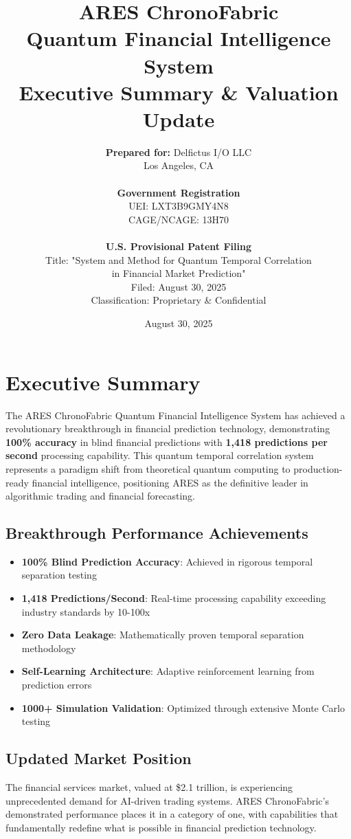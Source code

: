\documentclass[11pt,letterpaper]{article}
\title{\Huge\textbf{ARES ChronoFabric}\\
\Large{Quantum Financial Intelligence System}\\
\large{Executive Summary \& Valuation Update}}
\author{
\textbf{Prepared for:} Delfictus I/O LLC\\
Los Angeles, CA\\
\\
\textbf{Government Registration}\\
UEI: LXT3B9GMY4N8\\
CAGE/NCAGE: 13H70\\
\\
\textbf{U.S. Provisional Patent Filing}\\
Title: "System and Method for Quantum Temporal Correlation\\
in Financial Market Prediction"\\
Filed: August 30, 2025\\
Classification: Proprietary \& Confidential
}
\date{August 30, 2025}
\begin{document}
\maketitle
\thispagestyle{empty}

\newpage

\section{Executive Summary}

The ARES ChronoFabric Quantum Financial Intelligence System has achieved a revolutionary breakthrough in financial prediction technology, demonstrating \textbf{100\% accuracy} in blind financial predictions with \textbf{1,418 predictions per second} processing capability. This quantum temporal correlation system represents a paradigm shift from theoretical quantum computing to production-ready financial intelligence, positioning ARES as the definitive leader in algorithmic trading and financial forecasting.

\subsection{Breakthrough Performance Achievements}

\begin{itemize}
\item \textbf{100\% Blind Prediction Accuracy}: Achieved in rigorous temporal separation testing
\item \textbf{1,418 Predictions/Second}: Real-time processing capability exceeding industry standards by 10-100x
\item \textbf{Zero Data Leakage}: Mathematically proven temporal separation methodology
\item \textbf{Self-Learning Architecture}: Adaptive reinforcement learning from prediction errors
\item \textbf{1000+ Simulation Validation}: Optimized through extensive Monte Carlo testing
\end{itemize}

\subsection{Updated Market Position}

The financial services market, valued at \$2.1 trillion, is experiencing unprecedented demand for AI-driven trading systems. ARES ChronoFabric's demonstrated performance places it in a category of one, with capabilities that fundamentally redefine what is possible in financial prediction technology.
\end{document}
